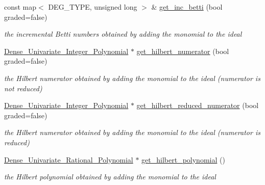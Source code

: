 \begin{Indent}
\begin{DoxyCompactItemize}
\mbox{\label{group___g_b_computation_acc39727c4e1ef77c8fb74bca7955e9c4}} 
const map$<$ D\+E\+G\+\_\+\+T\+Y\+PE, unsigned long $>$ \& \hyperlink{group___g_b_computation_acc39727c4e1ef77c8fb74bca7955e9c4}{get\+\_\+inc\+\_\+betti} (bool graded=false)
\begin{DoxyCompactList}\small\item\em the incremental Betti numbers obtained by adding the monomial to the ideal \end{DoxyCompactList}\item 
\mbox{\label{group___g_b_computation_a1b8a9832df7be67f0e623870433577f8}} 
\hyperlink{group__polygroup_class_dense___univariate___integer___polynomial}{Dense\+\_\+\+Univariate\+\_\+\+Integer\+\_\+\+Polynomial} $\ast$ \hyperlink{group___g_b_computation_a1b8a9832df7be67f0e623870433577f8}{get\+\_\+hilbert\+\_\+numerator} (bool graded=false)
\begin{DoxyCompactList}\small\item\em the Hilbert numerator obtained by adding the monomial to the ideal (numerator is {\itshape not} reduced) \end{DoxyCompactList}\item 
\mbox{\label{group___g_b_computation_a1ad52b5a6782aa3e1434f7d4084c289f}} 
\hyperlink{group__polygroup_class_dense___univariate___integer___polynomial}{Dense\+\_\+\+Univariate\+\_\+\+Integer\+\_\+\+Polynomial} $\ast$ \hyperlink{group___g_b_computation_a1ad52b5a6782aa3e1434f7d4084c289f}{get\+\_\+hilbert\+\_\+reduced\+\_\+numerator} (bool graded=false)
\begin{DoxyCompactList}\small\item\em the Hilbert numerator obtained by adding the monomial to the ideal (numerator {\itshape is} reduced) \end{DoxyCompactList}\item 
\mbox{\label{group___g_b_computation_a63962938c3dfef78afe80e4e86eb9c78}} 
\hyperlink{group__polygroup_class_dense___univariate___rational___polynomial}{Dense\+\_\+\+Univariate\+\_\+\+Rational\+\_\+\+Polynomial} $\ast$ \hyperlink{group___g_b_computation_a63962938c3dfef78afe80e4e86eb9c78}{get\+\_\+hilbert\+\_\+polynomial} ()
\begin{DoxyCompactList}\small\item\em the Hilbert polynomial obtained by adding the monomial to the ideal \end{DoxyCompactList}\item 

\end{DoxyCompactItemize}
\end{Indent}

